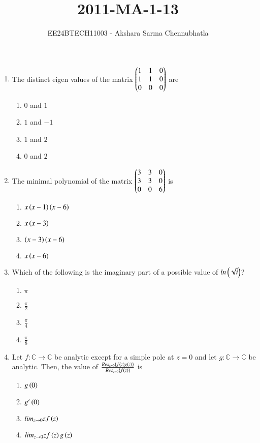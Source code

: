 \documentclass[journal,12pt,onecolumn]{IEEEtran}
\theoremstyle{remark}
\begin{document}

\title{2011-MA-1-13}
\author{EE24BTECH11003 - Akshara Sarma Chennubhatla%
}
\maketitle
\begin{enumerate}
\item The distinct eigen values of the matrix
$\begin{pmatrix}1 & 1 & 0\\1 & 1 & 0\\0 & 0 & 0\end{pmatrix}$ are
\begin{enumerate}
\item $0$ and $1$
\item $1$ and $-1$
\item $1$ and $2$
\item $0$ and $2$
\end{enumerate}

\item The minimal polynomial of the matrix
$\begin{pmatrix}3 & 3 & 0\\3 & 3 & 0\\0 & 0 & 6\end{pmatrix}$ is
\begin{enumerate}
\item $x\left(x-1\right)\left(x-6\right)$
\item $x\left(x-3\right)$
\item $\left(x-3\right)\left(x-6\right)$
\item $x\left(x-6\right)$
\end{enumerate}

\item Which of the following is the imaginary part of a possible value of $ln\left(\sqrt{i}\right)$?
\begin{enumerate}
\item $\pi$
\item $\frac{\pi}{2}$
\item $\frac{\pi}{4}$
\item $\frac{\pi}{8}$
\end{enumerate}

\item Let $f\colon \mathbb{C} \to \mathbb{C}$ be analytic except for a simple pole at $z=0$ and let $g\colon \mathbb{C} \to \mathbb{C}$ be analytic. Then, the value of $\frac{Res_{z=0}\left\{f\left(z\right)g\left(z\right)\right\}}{Res_{z=0}\left\{f\left(z\right)\right\}}$ is
\begin{enumerate}
\item $g\left(0\right)$
\item $g'\left(0\right)$
\item $lim_{z \to 0} zf\left(z\right)$
\item $lim_{z \to 0} zf\left(z\right)g\left(z\right)$
\end{enumerate}


\end{enumerate}
\end{document}
